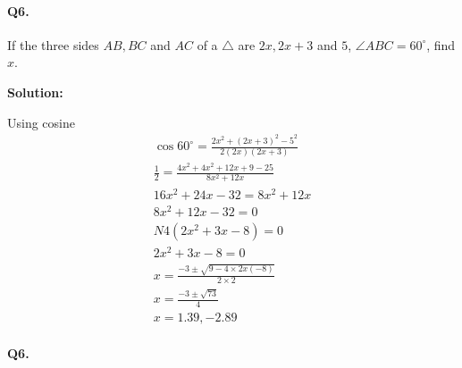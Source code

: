 \documentclass{article}
\begin{document}
\paragraph{Q6.}
If the three sides $AB, BC$ and $AC$ of a $\triangle$ are $2x, 2x+3$ and $5$, $\angle ABC=60^{\circ}$, find $x$.

{\scriptsize \textbf{Solution:}}

Using cosine
\[
  \begin{aligned}
    \cos 60^{\circ} = \frac{2x^{2}+(2x+3)^{2}-5^{2}}{2(2x)(2x+3)} \\
    \frac{1}{2} = \frac{4x^{2}+4x^{2}+12x+9-25}{8x^{2}+12x} \\
    16x^{2}+24x-32 = 8x^{2}+12x \\
    8x^{2}+12x-32 = 0 \\
    N4(2x^{2}+3x-8) = 0 \\
    2x^{2}+3x-8 = 0 \\
    x = \frac{-3 \pm \sqrt{9 - 4 \times 2x(-8)}}{2\times2} \\
    x = \frac{-3 \pm \sqrt{73}}{4} \\
    x = 1.39, -2.89
  \end{aligned}
\]

\paragraph{Q6.}
\end{document}
